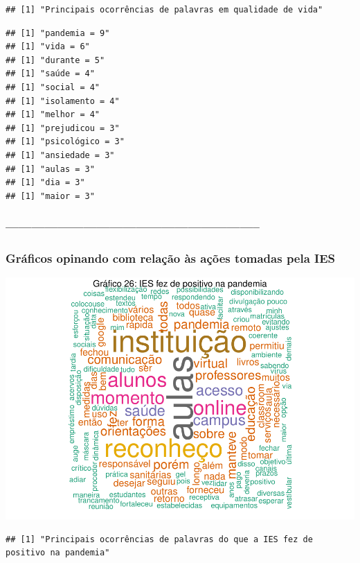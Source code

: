 \documentclass[
]{article}
\begin{document}
\begin{verbatim}
## [1] "Principais ocorrências de palavras em qualidade de vida"
\end{verbatim}

\begin{verbatim}
## [1] "pandemia = 9"
## [1] "vida = 6"
## [1] "durante = 5"
## [1] "saúde = 4"
## [1] "social = 4"
## [1] "isolamento = 4"
## [1] "melhor = 4"
## [1] "prejudicou = 3"
## [1] "psicológico = 3"
## [1] "ansiedade = 3"
## [1] "aulas = 3"
## [1] "dia = 3"
## [1] "maior = 3"
\end{verbatim}

\hypertarget{section}{%
\subsubsection{-----------------------------------------------------------}\label{section}}

\hypertarget{gruxe1ficos-opinando-com-relauxe7uxe3o-uxe0s-auxe7uxf5es-tomadas-pela-ies}{%
\subsubsection{Gráficos opinando com relação às ações tomadas pela
IES}\label{gruxe1ficos-opinando-com-relauxe7uxe3o-uxe0s-auxe7uxf5es-tomadas-pela-ies}}

\includegraphics{consequencias-oriundas-da-pandemia-v1.0_files/figure-latex/grafico-26-1.pdf}

\begin{verbatim}
## [1] "Principais ocorrências de palavras do que a IES fez de positivo na pandemia"
\end{verbatim}
\end{document}
